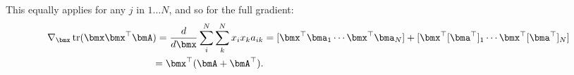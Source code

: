 \documentclass[11pt]{article}
\DeclareMathOperator{\Trace}{tr}
\begin{document}
This equally applies for any $j$ in $1\ldots N$, and so for the full gradient:
\begin{align*}
\nabla_{\bmx}\Trace(\bmx \bmx^\top \bmA) =
\frac{d}{d \bmx} \sum_{i}^{N} \sum_{k}^{N} x_i x_k a_{ik} &=
[\bmx^\top \bma_1 \cdots \bmx^\top \bma_N] + [\bmx^\top [\bma^\top]_1 \cdots \bmx^\top [\bma^\top]_N] \\
= \bmx^\top (\bmA + \bmA^\top).
\end{align*}
\end{document}
